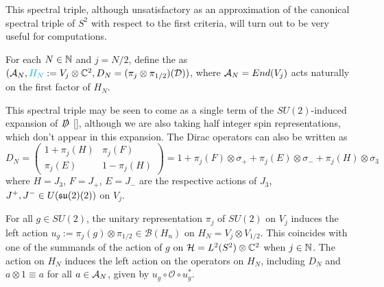         
    
        
\linea

This spectral triple, although unsatisfactory as an approximation of the canonical spectral triple of $S^2$ with respect to the first criteria, will turn out to be very useful for computations.

\begin{definition}
For each $N \in \mathbb{N}$ and $j = N/2$, define the  as $(\mathcal A_N, \textcolor{cyan}{H_N} := V_j \otimes \mathbb{C}^2, D_N = (\pi_j \otimes \pi_{1/2})(\mathcal D))$, where $\mathcal A_N = End(V_j)$ acts naturally on the first factor of $H_N$.
\end{definition}

This spectral triple may be seen to come as a single term of the $SU(2)$-induced expansion of $\slashed D$ \eqref{}, although we are also taking half integer spin representations, which don't appear in this expansion. The Dirac operators can also be written as
\begin{equation}
    D_N = \begin{pmatrix} 1 + \pi_j(H) & \pi_j(F) \\ \pi_j(E) & 1 - \pi_j(H)\end{pmatrix} 
    = 1 + \pi_j(F) \otimes \sigma_+ + \pi_j(E) \otimes \sigma_- + \pi_j(H) \otimes \sigma_3
\end{equation}
where $H = J_3$, $F = J_+$, $E = J_-$ are the respective actions of $J_3$, $J^+, J^- \in U(\mathfrak{su}(2)(2))$ on $V_j$.

For all $g \in SU(2)$, the unitary representation $\pi_j$ of $SU(2)$ on $V_j$ induces the left action $u_g := \pi_j(g) \otimes \pi_{1/2} \in \mathcal B(H_n)$ on $H_N = V_j \otimes V_{1/2}$. This coincides with one of the summands of the action of $g$ on $\mathcal H = L^2(S^2) \otimes \mathbb{C}^2$ when $j \in \mathbb{N}$. The action on $H_N$ induces the left action on the operators on $H_N$, including $D_N$ and $a \otimes 1 \equiv a$ for all $a \in \mathcal A_N$, given by $u_g \circ \mathcal O \circ u_{g}^*$.

